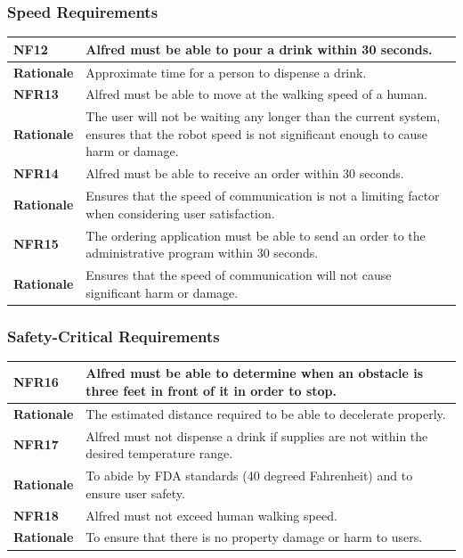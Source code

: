 \documentclass [11pt]{article}
\begin{document}
\subsubsection{Speed Requirements }

\begin{longtable}{| p{ } | p{ } | }\hline 
\rowcolor{tableCell}\textbf{NF12} & Alfred must be able to pour a drink within 30 seconds. \\ \hline
\textbf{Rationale} & Approximate time for a person to dispense a drink. \\ \hline 
\rowcolor{tableCell}\textbf{NFR13} & Alfred must be able to move at the walking speed of a human. \\ \hline
\textbf{Rationale} & The user will not be waiting any longer than the current system, ensures that the robot speed is not significant enough to cause harm or damage. \\ \hline 
\rowcolor{tableCell}\textbf{NFR14} &  Alfred must be able to receive an order within 30 seconds. \\ \hline
\textbf{Rationale} & Ensures that the speed of communication is not a limiting factor when considering user satisfaction.\\ \hline
\rowcolor{tableCell}\textbf{NFR15} &  The ordering application must be able to send an order to the administrative program within 30 seconds. \\ \hline
\textbf{Rationale} & Ensures that the speed of communication will not cause significant harm or damage.\\ \hline
\end{longtable}
	

\subsubsection{Safety-Critical Requirements }

\begin{longtable}{| p{ } | p{ } | }\hline 
\rowcolor{tableCell}\textbf{NFR16} &  Alfred must be able to determine when an obstacle is three feet in front of it in order to stop. \\ \hline
\textbf{Rationale} & The estimated distance required to be able to decelerate properly.\\ \hline 
\rowcolor{tableCell}\textbf{NFR17} & Alfred must not dispense a drink if supplies are not within the desired temperature range. \\ \hline
\textbf{Rationale} & To abide by FDA standards (40 degreed Fahrenheit) and to ensure user safety.\\ \hline 
\rowcolor{tableCell}\textbf{NFR18} & Alfred must not exceed human walking speed.\\ \hline
\textbf{Rationale} & To ensure that there is no property damage or harm to users.\\ \hline 
\end{longtable}
\end{document}
